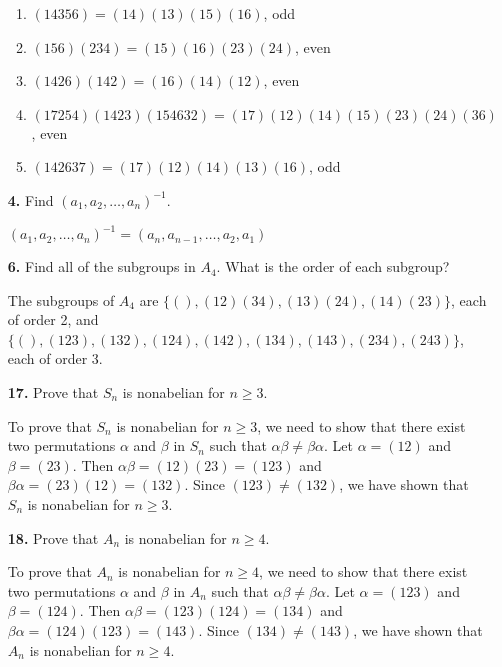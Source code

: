 \documentclass[12pt,reqno]{amsart}
\newcommand{\probskip}{\vskip1cm}
\begin{document}
\begin{enumerate}[{\bf 1.}]
\begin{multicols}{2}
\begin{enumerate}
\item
$(14356)=(14)(13)(15)(16)$, odd

 \item
$(156)(234)=(15)(16)(23)(24)$, even
 
 \item
$(1426)(142)=(16)(14)(12)$, even
 
 \item
$(17254)(1423)(154632)=(17)(12)(14)(15)(23)(24)(36)$, even
 
 \item
$(142637)=(17)(12)(14)(13)(16)$, odd
 
\end{enumerate}
\end{multicols}

\probskip
 
\item[{\bf 4.}] 
Find $(a_1, a_2, \ldots, a_n)^{-1}$.

$(a_1, a_2, \ldots, a_n)^{-1}=(a_n, a_{n-1}, \ldots, a_2, a_1)$

\probskip
 
\item[{\bf 6.}] 
Find all of the subgroups in $A_4$. What is the order of each
subgroup? 

The subgroups of $A_4$ are $\{(), (12)(34), (13)(24), (14)(23)\}$, each of order 2, and $\{(), (123), (132), (124), (142), (134), (143), (234), (243)\}$, each of order 3.

\probskip

\item[{\bf 17.}] 
Prove that $S_n$ is nonabelian for $n \geq 3$.

To prove that $S_n$ is nonabelian for $n \geq 3$, we need to show that there exist two permutations $\alpha$ and $\beta$ in $S_n$ such that $\alpha\beta \neq \beta\alpha$. Let $\alpha=(12)$ and $\beta=(23)$. Then $\alpha\beta=(12)(23)=(123)$ and $\beta\alpha=(23)(12)=(132)$. Since $(123) \neq (132)$, we have shown that $S_n$ is nonabelian for $n \geq 3$.

\probskip
 
\item[{\bf 18.}] 
Prove that $A_n$ is nonabelian for $n \geq 4$.

To prove that $A_n$ is nonabelian for $n \geq 4$, we need to show that there exist two permutations $\alpha$ and $\beta$ in $A_n$ such that $\alpha\beta \neq \beta\alpha$. Let $\alpha=(123)$ and $\beta=(124)$. Then $\alpha\beta=(123)(124)=(134)$ and $\beta\alpha=(124)(123)=(143)$. Since $(134) \neq (143)$, we have shown that $A_n$ is nonabelian for $n \geq 4$.


\end{enumerate}
\end{document}
